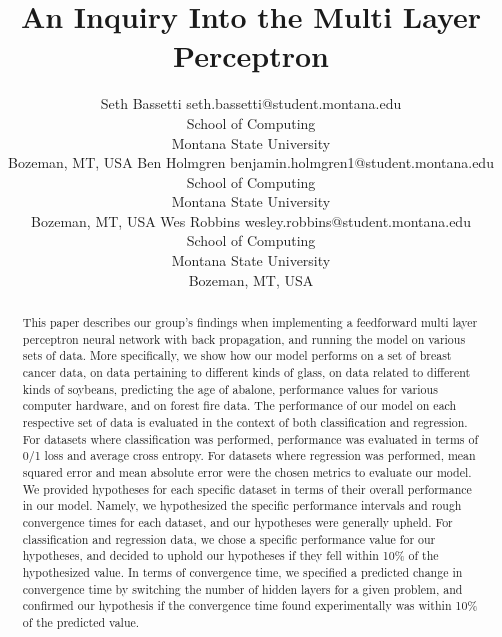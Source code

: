 \documentclass[twoside,11pt]{article}
\begin{document}
\title{An Inquiry Into the Multi Layer Perceptron}

\author{\name Seth Bassetti \email seth.bassetti@student.montana.edu \\
       \addr School of Computing\\
       Montana State University\\
       Bozeman, MT, USA
	\AND
	\name Ben Holmgren \email benjamin.holmgren1@student.montana.edu \\
       \addr School of Computing\\
       Montana State University\\
       Bozeman, MT, USA
       \AND
       \name Wes Robbins \email wesley.robbins@student.montana.edu \\
       \addr School of Computing\\
       Montana State University\\
       Bozeman, MT, USA}

\maketitle

\begin{abstract}%
This paper describes our group's findings when implementing a feedforward multi layer
perceptron neural network with back propagation, and running the model on various sets of data. 
 More specifically, we show how our model performs on a set of breast cancer data, on data pertaining
to different kinds of glass, on data related to different kinds of soybeans, predicting the age of abalone,
performance values for various computer hardware, and on forest fire data.
	The performance of our model on each respective set of data
 is evaluated in the context of both classification and regression. For datasets where
 classification was performed, performance was evaluated in terms of
 0/1 loss and average cross entropy. For datasets where regression was performed,
 mean squared error and mean absolute error were the chosen metrics to evaluate
 our model. We provided hypotheses for each specific dataset in terms of their overall performance in our model.
 Namely, we hypothesized the specific performance intervals and rough convergence times for each dataset, and our
 hypotheses were generally upheld. For classification and regression data, we chose a specific performance value for
our hypotheses, and decided to uphold our hypotheses if they fell within 10\% of the hypothesized
value. In terms of convergence time, we specified a predicted change in convergence time by switching the number
	of hidden layers for a given problem, and confirmed our hypothesis
if the convergence time found experimentally was within 10\% of the predicted value.
\end{abstract}
\end{document}
